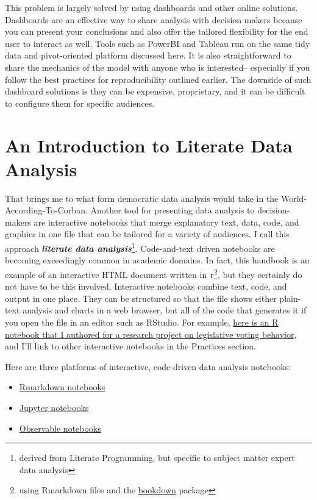 \documentclass[
]{book}
\providecommand{\tightlist}{%
  \setlength{\itemsep}{0pt}\setlength{\parskip}{0pt}}
\begin{document}
This problem is largely solved by using dashboards and other online solutions. Dashboards are an effective way to share analysis with decision makers because you can present your conclusions and also offer the tailored flexibility for the end user to interact as well. Tools such as PowerBI and Tableau run on the same tidy data and pivot-oriented platform discussed here. It is also straightforward to share the mechanics of the model with anyone who is interested-- especially if you follow the best practices for reproducibility outlined earlier. The downside of such dashboard solutions is they can be expensive, proprietary, and it can be difficult to configure them for specific audiences.

\hypertarget{an-introduction-to-literate-data-analysis}{%
\section{An Introduction to Literate Data Analysis}\label{an-introduction-to-literate-data-analysis}}

That brings me to what form democratic data analysis would take in the World-According-To-Corban. Another tool for presenting data analysis to decision-makers are interactive notebooks that merge explanatory text, data, code, and graphics in one file that can be tailored for a variety of audiences. I call this approach \textbf{\emph{literate data analysis}}\footnote{derived from Literate Programming, but specific to subject matter expert data analysis}. Code-and-text driven notebooks are becoming exceedingly common in academic domains. In fact, this handbook is an example of an interactive HTML document written in \texttt{r}\footnote{using Rmarkdown files and the \href{bookdown.org}{bookdown} package}, but they certainly do not have to be this involved. Interactive notebooks combine text, code, and output in one place. They can be structured so that the file shows either plain-text analysis and charts in a web browser, but all of the code that generates it if you open the file in an editor such as RStudio. For example, \href{https://nemethc.com/evaluating_legislator_efficiency.nb.html\#}{here is an R notebook that I authored for a research project on legislative voting behavior}, and I'll link to other interactive notebooks in the Practices section.

Here are three platforms of interactive, code-driven data analysis notebooks:

\begin{itemize}
\tightlist
\item
  \href{https://rmarkdown.rstudio.com}{Rmarkdown notebooks}
\item
  \href{https://jupyter-notebook.readthedocs.io/en/stable/}{Jupyter notebooks}
\item
  \href{https://observablehq.com}{Observable notebooks}
\end{itemize}
\end{document}
